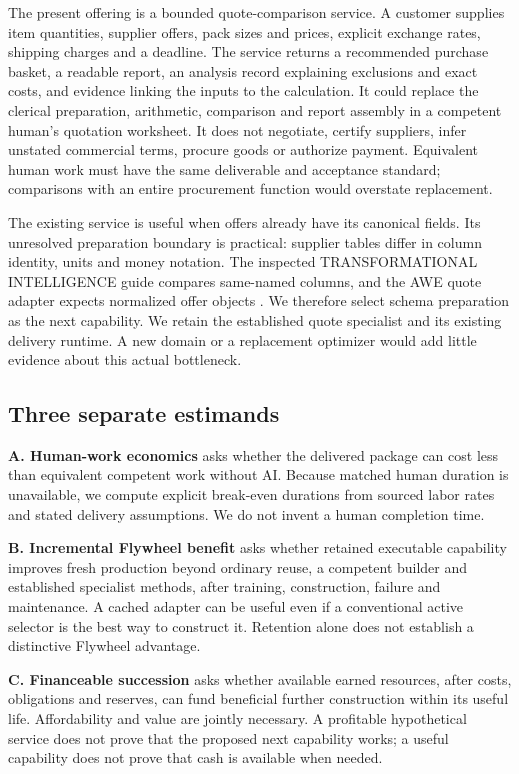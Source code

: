 \documentclass[11pt,letterpaper]{article}
\begin{document}
The present offering is a bounded quote-comparison service. A customer supplies item quantities, supplier offers, pack sizes and prices, explicit exchange rates, shipping charges and a deadline. The service returns a recommended purchase basket, a readable report, an analysis record explaining exclusions and exact costs, and evidence linking the inputs to the calculation. It could replace the clerical preparation, arithmetic, comparison and report assembly in a competent human's quotation worksheet. It does not negotiate, certify suppliers, infer unstated commercial terms, procure goods or authorize payment. Equivalent human work must have the same deliverable and acceptance standard; comparisons with an entire procurement function would overstate replacement.

The existing service is useful when offers already have its canonical fields. Its unresolved preparation boundary is practical: supplier tables differ in column identity, units and money notation. The inspected TRANSFORMATIONAL INTELLIGENCE guide compares same-named columns, and the AWE quote adapter expects normalized offer objects \cite{alpha,awe}. We therefore select schema preparation as the next capability. We retain the established quote specialist and its existing delivery runtime. A new domain or a replacement optimizer would add little evidence about this actual bottleneck.

\subsection{Three separate estimands}

\textbf{A. Human-work economics} asks whether the delivered package can cost less than equivalent competent work without AI. Because matched human duration is unavailable, we compute explicit break-even durations from sourced labor rates and stated delivery assumptions. We do not invent a human completion time.

\textbf{B. Incremental Flywheel benefit} asks whether retained executable capability improves fresh production beyond ordinary reuse, a competent builder and established specialist methods, after training, construction, failure and maintenance. A cached adapter can be useful even if a conventional active selector is the best way to construct it. Retention alone does not establish a distinctive Flywheel advantage.

\textbf{C. Financeable succession} asks whether available earned resources, after costs, obligations and reserves, can fund beneficial further construction within its useful life. Affordability and value are jointly necessary. A profitable hypothetical service does not prove that the proposed next capability works; a useful capability does not prove that cash is available when needed.
\end{document}
